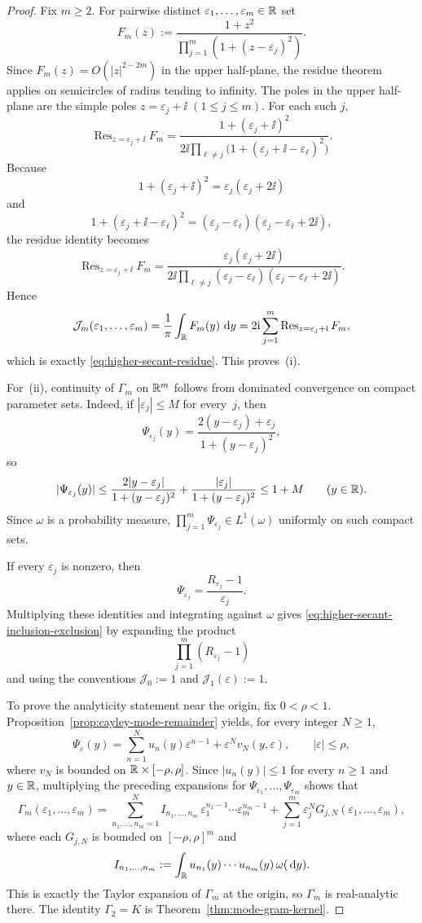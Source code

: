 \begin{proof}
Fix $m\ge 2$.  For pairwise distinct
$\varepsilon_1,\dots,\varepsilon_m\in\mathbb{R}$ set
\[
F_m(z)
:=
\frac{1+z^2}{\prod_{j=1}^m(1+(z-\varepsilon_j)^2)}.
\]
Since $F_m(z)=O(|z|^{2-2m})$ in the upper half-plane, the residue
theorem applies on semicircles of radius tending to infinity.  The poles
in the upper half-plane are the simple poles
$z=\varepsilon_j+\ii$ $(1\le j\le m)$.  For each such $j$,
\[
\operatorname{Res}_{z=\varepsilon_j+\ii}F_m
=
\frac{1+(\varepsilon_j+\ii)^2}
{2\ii\displaystyle\prod_{\ell\ne j}
\bigl(1+(\varepsilon_j+\ii-\varepsilon_\ell)^2\bigr)}.
\]
Because
\[
1+(\varepsilon_j+\ii)^2=\varepsilon_j(\varepsilon_j+2\ii)
\]
and
\[
1+(\varepsilon_j+\ii-\varepsilon_\ell)^2
=(\varepsilon_j-\varepsilon_\ell)
(\varepsilon_j-\varepsilon_\ell+2\ii),
\]
the residue identity becomes
\[
\operatorname{Res}_{z=\varepsilon_j+\ii}F_m
=
\frac{\varepsilon_j(\varepsilon_j+2\ii)}
{2\ii\displaystyle\prod_{\ell\ne j}
(\varepsilon_j-\varepsilon_\ell)
(\varepsilon_j-\varepsilon_\ell+2\ii)}.
\]
Hence
\[
\mathcal J_m(\varepsilon_1,\dots,\varepsilon_m)
=\frac{1}{\pi}\int_{\mathbb{R}}F_m(y)\,\,\mathrm{d} y
=2\mathrm{i}\sum_{j=1}^m \operatorname{Res}_{z=\varepsilon_j+\mathrm{i}}F_m,
\]
which is exactly \eqref{eq:higher-secant-residue}.  This proves~(i).

For~(ii), continuity of $\Gamma_m$ on $\mathbb{R}^m$ follows from dominated
convergence on compact parameter sets.  Indeed, if
$|\varepsilon_j|\le M$ for every~$j$, then
\[
\Psi_{\varepsilon_j}(y)
=\frac{2(y-\varepsilon_j)+\varepsilon_j}{1+(y-\varepsilon_j)^2},
\]
so
\[
\lvert \Psi_{\varepsilon_j}(y)\rvert
\le \frac{2\lvert y-\varepsilon_j\rvert}{1+(y-\varepsilon_j)^2}
+\frac{|\varepsilon_j|}{1+(y-\varepsilon_j)^2}
\le 1+M
\qquad(y\in\mathbb{R}).
\]
Since $\omega$ is a probability measure,
$\prod_{j=1}^m\Psi_{\varepsilon_j}\in L^1(\omega)$ uniformly on such
compact sets.

If every $\varepsilon_j$ is nonzero, then
\[
\Psi_{\varepsilon_j}=\frac{R_{\varepsilon_j}-1}{\varepsilon_j}.
\]
Multiplying these identities and integrating against $\omega$ gives
\eqref{eq:higher-secant-inclusion-exclusion} by expanding the product
\[
\prod_{j=1}^m(R_{\varepsilon_j}-1)
\]
and using the conventions $\mathcal J_0:=1$ and
$\mathcal J_1(\varepsilon):=1$.

To prove the analyticity statement near the origin, fix $0<\rho<1$.
Proposition~\ref{prop:cayley-mode-remainder} yields, for every integer
$N\ge 1$,
\[
\Psi_\varepsilon(y)
=\sum_{n=1}^{N}u_n(y)\varepsilon^{n-1}
+\varepsilon^N v_N(y,\varepsilon),
\qquad |\varepsilon|\le \rho,
\]
where $v_N$ is bounded on $\mathbb{R}\times[-\rho,\rho]$.  Since
$|u_n(y)|\le 1$ for every $n\ge 1$ and $y\in\mathbb{R}$, multiplying the
preceding expansions for $\Psi_{\varepsilon_1},\dots,\Psi_{\varepsilon_m}$
shows that
\[
\Gamma_m(\varepsilon_1,\dots,\varepsilon_m)
=
\sum_{n_1,\dots,n_m=1}^{N}
I_{n_1,\dots,n_m}\,
\varepsilon_1^{n_1-1}\cdots\varepsilon_m^{n_m-1}
+\sum_{j=1}^m\varepsilon_j^N G_{j,N}(\varepsilon_1,\dots,\varepsilon_m),
\]
where each $G_{j,N}$ is bounded on $[-\rho,\rho]^m$ and
\[
I_{n_1,\dots,n_m}
:=
\int_{\mathbb{R}}
u_{n_1}(y)\cdots u_{n_m}(y)\,\omega(\,\mathrm{d} y).
\]
This is exactly the Taylor expansion of $\Gamma_m$ at the origin, so
$\Gamma_m$ is real-analytic there.  The identity $\Gamma_2=K$ is
Theorem~\ref{thm:mode-gram-kernel}.


\end{proof}
